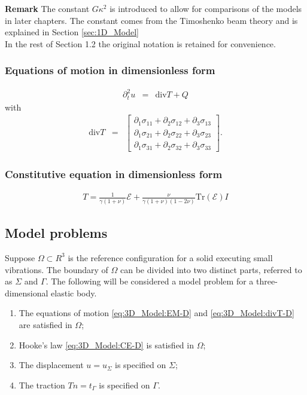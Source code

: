\documentclass[../../main.tex]{subfiles}ite{VS18}
\begin{document}
\textbf{Remark} The constant $G\kappa^2$ is introduced to allow for comparisons of the models in later chapters. The constant comes from the Timoshenko beam theory and is explained in Section \ref{sec:1D_Model} \\

In the rest of Section 1.2 the original notation is retained for convenience.

\subsubsection*{Equations of motion in dimensionless form}\label{sssec:3D_Model:EquationOfMotionDimensionless}
\begin{eqnarray}
	\partial_t^2 u & = & \textrm{div}T + Q \label{eq:3D_Model:EM-D}
\end{eqnarray}
with
\begin{eqnarray}
	\textrm{div}  T & = &
	\begin{bmatrix}
		\partial_1 \sigma_{11} + \partial_2 \sigma_{12} + \partial_3 \sigma_{13} \\
		\partial_1 \sigma_{21} + \partial_2 \sigma_{22} + \partial_3 \sigma_{23} \\
		\partial_1 \sigma_{31} + \partial_2 \sigma_{32} + \partial_3 \sigma_{33}
	\end{bmatrix}.\label{eq:3D_Model:divT-D}
\end{eqnarray}

\subsubsection*{Constitutive equation in dimensionless form}\label{sssec:3D_Model:ConstitutiveEquationsDimensionless}
\begin{eqnarray}
	T = \frac{1}{\gamma(1+\nu)} \mathcal{E} + \frac{\nu}{\gamma(1+\nu)(1-2\nu)}\textrm{Tr}(\mathcal{E})I \label{eq:3D_Model:CE-D}
\end{eqnarray}

\subsection{Model problems}\label{ssec:3D_Model:ModelProblems}
Suppose $\Omega \subset R^3$ is the reference configuration for a solid
executing small vibrations. The boundary of $\Omega$ can be divided into two
distinct parts, referred to as $\Sigma$ and $\Gamma$. The following will be
considered a model problem for a three-dimensional elastic body.
\begin{enumerate}
	\item[] The equations of motion \eqref{eq:3D_Model:EM-D} and \eqref{eq:3D_Model:divT-D} are satisfied in $\Omega$;
	\item[] Hooke's law \eqref{eq:3D_Model:CE-D} is satisfied in $\Omega$;
	\item[] The displacement $u = u_\Sigma$ is specified on
		$\Sigma$;
	\item[] The traction $Tn = t_\Gamma$ is specified on
		$\Gamma$.
\end{enumerate} \label{sym:n}\label{sym:SigmaGamma}
\end{document}
